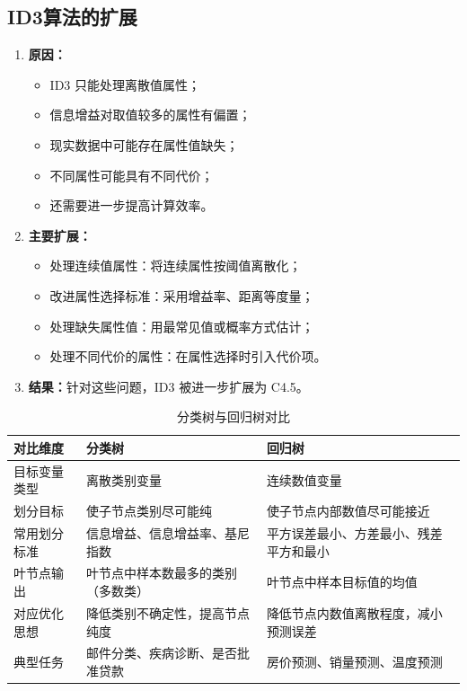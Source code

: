 \documentclass[../main.tex]{subfiles}
\begin{document}
\subsection{ID3算法的扩展}\label{sec:dt-extensions}
\begin{enumerate}
    \item \textbf{原因：}
    \begin{itemize}
        \item ID3 只能处理离散值属性；
        \item 信息增益对取值较多的属性有偏置；
        \item 现实数据中可能存在属性值缺失；
        \item 不同属性可能具有不同代价；
        \item 还需要进一步提高计算效率。
    \end{itemize}

    \item \textbf{主要扩展：}
    \begin{itemize}
        \item 处理连续值属性：将连续属性按阈值离散化；
        \item 改进属性选择标准：采用增益率、距离等度量；
        \item 处理缺失属性值：用最常见值或概率方式估计；
        \item 处理不同代价的属性：在属性选择时引入代价项。
    \end{itemize}

    \item \textbf{结果：}针对这些问题，ID3 被进一步扩展为 C4.5。
\end{enumerate}
\begin{table}[H]
\centering
\caption{分类树与回归树对比}
\begin{tabular}{p{2.6cm}p{5.2cm}p{5.2cm}}
\toprule
\textbf{对比维度} & \textbf{分类树} & \textbf{回归树} \\
\midrule
目标变量类型 & 离散类别变量 & 连续数值变量 \\
划分目标 & 使子节点类别尽可能纯 & 使子节点内部数值尽可能接近 \\
常用划分标准 & 信息增益、信息增益率、基尼指数 & 平方误差最小、方差最小、残差平方和最小 \\
叶节点输出 & 叶节点中样本数最多的类别（多数类） & 叶节点中样本目标值的均值 \\
对应优化思想 & 降低类别不确定性，提高节点纯度 & 降低节点内数值离散程度，减小预测误差 \\
典型任务 & 邮件分类、疾病诊断、是否批准贷款 & 房价预测、销量预测、温度预测 \\
\bottomrule
\end{tabular}
\end{table}
\end{document}
